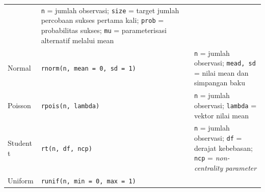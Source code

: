 \documentclass[]{book}
\theoremstyle{definition}
\theoremstyle{definition}
\theoremstyle{definition}
\theoremstyle{remark}
\begin{document}
\begin{longtable}[]{@{}lll@{}}
\begin{minipage}[t]{0.19\columnwidth}
\end{minipage} & \begin{minipage}[t]{0.65\columnwidth}\raggedright
\texttt{n} = jumlah observasi; \texttt{size} = target jumlah percobaan sukses pertama kali; \texttt{prob} = probabilitas sukses; \texttt{mu} = parameterisasi alternatif melalui mean\strut
\end{minipage}\tabularnewline
\begin{minipage}[t]{0.07\columnwidth}\raggedright
Normal\strut
\end{minipage} & \begin{minipage}[t]{0.19\columnwidth}\raggedright
\texttt{rnorm(n,\ mean\ =\ 0,\ sd\ =\ 1)}\strut
\end{minipage} & \begin{minipage}[t]{0.65\columnwidth}\raggedright
\texttt{n} = jumlah observasi; \texttt{mead,\ sd} = nilai mean dan simpangan baku\strut
\end{minipage}\tabularnewline
\begin{minipage}[t]{0.07\columnwidth}\raggedright
Poisson\strut
\end{minipage} & \begin{minipage}[t]{0.19\columnwidth}\raggedright
\texttt{rpois(n,\ lambda)}\strut
\end{minipage} & \begin{minipage}[t]{0.65\columnwidth}\raggedright
\texttt{n} = jumlah observasi; \texttt{lambda} = vektor nilai mean\strut
\end{minipage}\tabularnewline
\begin{minipage}[t]{0.07\columnwidth}\raggedright
Student t\strut
\end{minipage} & \begin{minipage}[t]{0.19\columnwidth}\raggedright
\texttt{rt(n,\ df,\ ncp)}\strut
\end{minipage} & \begin{minipage}[t]{0.65\columnwidth}\raggedright
\texttt{n} = jumlah observasi; \texttt{df} = derajat kebebasan; \texttt{ncp} = \emph{non-centrality parameter}\strut
\end{minipage}\tabularnewline
\begin{minipage}[t]{0.07\columnwidth}\raggedright
Uniform\strut
\end{minipage} & \begin{minipage}[t]{0.19\columnwidth}\raggedright
\texttt{runif(n,\ min\ =\ 0,\ max\ =\ 1)}\strut
\end{minipage} & \begin{minipage}[t]{0.65\columnwidth}\raggedright

\end{minipage}
\end{longtable}
\end{document}
